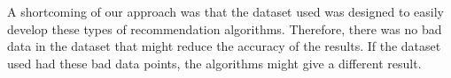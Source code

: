 \documentclass{report}
\begin{document}
	A shortcoming of our approach was that the dataset used was designed to easily develop these types of recommendation algorithms. Therefore, there was no bad data in the dataset that might reduce the accuracy of the results. If the dataset used had these bad data points, the algorithms might give a different result.
	
	\newpage
	\printbibliography
	
\end{document}
